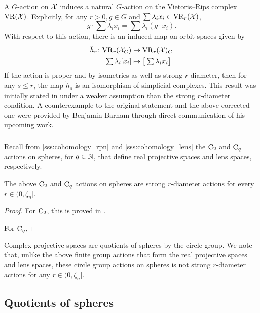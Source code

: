 A \(G\)-action on $\mathcal{X}$ induces a natural \(G\)-action on the Vietoris--Rips complex $\mathrm{VR}(\mathcal{X})$.
Explicitly, for any \(r > 0, g\in G\) and $\sum \lambda_i x_i \in \mathrm{VR}_r(\mathcal{X})$,
\[
g \cdot \sum \lambda_i x_i = \sum \lambda_i (g\cdot x_i).
\]
With respect to this action, there is an induced map on orbit spaces given by
\begin{align*}
	\tilde h_r \colon \mathrm{VR}_r(\mathcal{X}_G) &\to \mathrm{VR}_r(\mathcal{X})_G \\
	\textstyle\sum\lambda_i [x_i] &\mapsto \textstyle \big[\sum\lambda_i x_i\big].
\end{align*}
If the action is proper and by isometries as well as strong \(r\)-diameter, then for any \(s \leq r\), the map $\tilde{h}_s$ is an isomorphism of simplicial complexes.
This result was initially stated in \cite[Prop.~3.5]{adams2022metric} under a weaker assumption than the strong \(r\)-diameter condition.
A counterexample to the original statement and the above corrected one were provided by Benjamin Barham through direct communication of his upcoming work.


\subsubsection{} \label{sss:strong_r_action_examples}

Recall from \cref{sss:cohomology_rpn} and \cref{sss:cohomology_lens} the $\mathrm{C}_2$ and $\mathrm{C}_q$ actions on spheres, for $ q\in \mathbb{N}$, that define real projective spaces and lens spaces, respectively. 

\medskip\lemma
The above $\mathrm{C}_2$ and $\mathrm{C}_q$ actions on spheres are strong $r$-diameter actions for every $r\in (0, \zeta_n]$.

\begin{proof}
    For $\mathrm{C}_2$, this is proved in \cite[Cor.~4.3]{adams2022metric}.

    For $\mathrm{C}_q$, 
\end{proof}

Complex projective spaces are quotients of spheres by the circle group.
We note that, unlike the above finite group actions that form the real projective spaces and lens spaces, these circle group actions on spheres is not strong $r$-diameter actions for any $r\in (0, \zeta_n]$. 

\subsection{Quotients of spheres}

